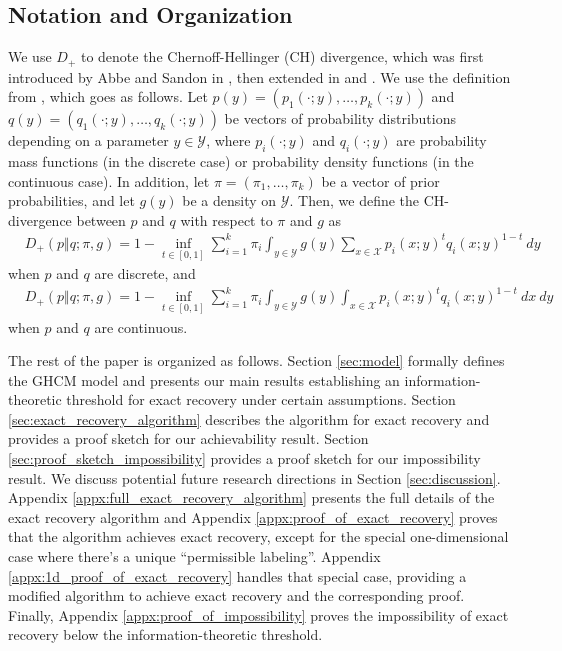 \documentclass{article}
\newcommand{\1}{\mathbbm{1}}
\newcommand{\calY}{\mathcal{Y}}
\theoremstyle{definition}
\theoremstyle{plain}
\begin{document}
\subsection{Notation and Organization}
We use $D_+$ to denote the Chernoff-Hellinger (CH) divergence, which was first introduced by Abbe and Sandon in \cite{AbbeSandon2015a}, then extended in \cite{Gaudio+2025} and \cite{GaudioJin2025}. We use the definition from \cite{GaudioJin2025}, which goes as follows. Let $p(y) = (p_1(\cdot;y), \ldots, p_k(\cdot; y))$ and $q(y) = (q_1(\cdot; y), \ldots, q_k(\cdot ;y))$ be vectors of probability distributions depending on a parameter $y \in \calY$, where $p_i(\cdot; y)$ and $q_i(\cdot; y)$ are probability mass functions (in the discrete case) or probability density functions (in the continuous case). In addition, let $\pi = (\pi_1, \ldots, \pi_k)$ be a vector of prior probabilities, and let $g(y)$ be a density on $\mathcal{Y}$. Then, we define the CH-divergence between $p$ and $q$ with respect to $\pi$ and $g$ as
\begin{equation}
\label{eq:CH_divergence_discrete}
\begin{aligned}
    &D_+(p \Vert q; \pi, g) =  1 - \inf_{t \in [0,1]} \sum_{i = 1}^k \pi_i \int_{y \in \mathcal{Y}} g(y)\sum_{x \in \mathcal{X}} p_i(x;y)^t q_i(x;y)^{1-t} \: dy
\end{aligned}
\end{equation}
when $p$ and $q$ are discrete, and 
\begin{equation}
\label{eq:CH_divergence_continuous}
\begin{aligned}
    &D_+(p \Vert q; \pi, g) =  1 - \inf_{t \in [0,1]} \sum_{i = 1}^k \pi_i \int_{y \in \mathcal{Y}} g(y) \int_{x \in \mathcal{X}} p_i(x;y)^t q_i(x;y)^{1-t} \: dx \: dy
\end{aligned}
\end{equation}
when $p$ and $q$ are continuous. 

The rest of the paper is organized as follows. Section \ref{sec:model} formally defines the GHCM model and presents our main results establishing an information-theoretic threshold for exact recovery under certain assumptions. Section \ref{sec:exact_recovery_algorithm} describes the algorithm for exact recovery and provides a proof sketch for our achievability result. Section \ref{sec:proof_sketch_impossibility} provides a proof sketch for our impossibility result. We discuss potential future research directions in Section \ref{sec:discussion}. Appendix \ref{appx:full_exact_recovery_algorithm} presents the full details of the exact recovery algorithm and Appendix \ref{appx:proof_of_exact_recovery} proves that the algorithm achieves exact recovery, except for the special one-dimensional case where there's a unique ``permissible labeling''. Appendix \ref{appx:1d_proof_of_exact_recovery} handles that special case, providing a modified algorithm to achieve exact recovery and the corresponding proof. Finally, Appendix \ref{appx:proof_of_impossibility} proves the impossibility of exact recovery below the information-theoretic threshold.
\end{document}
